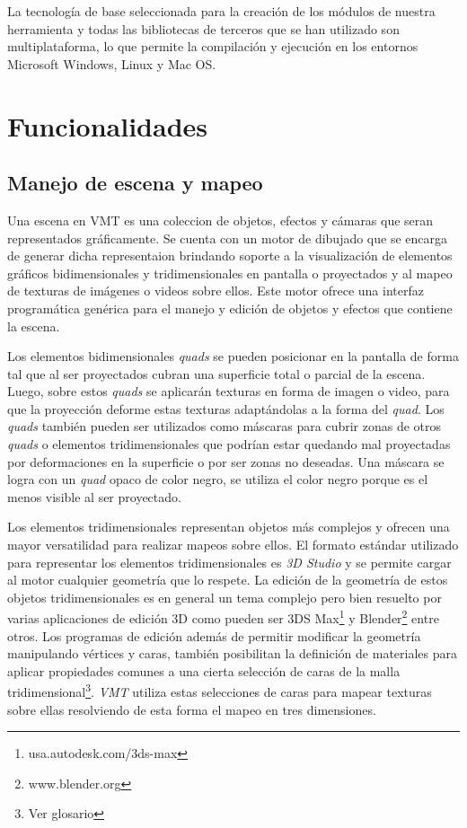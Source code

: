 La tecnología de base seleccionada para la creación de los módulos de nuestra herramienta y todas las bibliotecas de terceros que se han utilizado son multiplataforma, lo que permite la compilación y ejecución en los entornos Microsoft Windows, Linux y Mac OS.

\section{Funcionalidades}

\subsection{Manejo de escena y mapeo}

Una escena en VMT es una coleccion de objetos, efectos y cámaras que seran representados gráficamente. Se cuenta con un motor de dibujado que se encarga de generar dicha representaion brindando soporte a la visualización de elementos gráficos bidimensionales y tridimensionales en pantalla o proyectados y al mapeo de texturas de imágenes o videos sobre ellos. Este motor ofrece una interfaz programática genérica para el manejo y edición de objetos y efectos que contiene la escena.

Los elementos bidimensionales \emph{quads} se pueden posicionar en la pantalla de forma tal que al ser proyectados cubran una superficie total o parcial de la escena. Luego, sobre estos \emph{quads} se aplicarán texturas en forma de imagen o video, para que la proyección deforme estas texturas adaptándolas a la forma del \emph{quad}.
Los \emph{quads} también pueden ser utilizados como máscaras para cubrir zonas de otros \emph{quads} o elementos tridimensionales que podrían estar quedando mal proyectadas por deformaciones en la superficie o por ser zonas no deseadas. Una máscara se logra con un \emph{quad} opaco de color negro, se utiliza el color negro porque es el menos visible al ser proyectado.

Los elementos tridimensionales representan objetos más complejos y ofrecen una mayor versatilidad para realizar mapeos sobre ellos.
El formato estándar utilizado para representar los elementos tridimensionales es \emph{3D Studio}\cite{3DS} y se permite cargar al motor cualquier geometría que lo respete.
La edición de la geometría de estos objetos tridimensionales es en general un tema complejo pero bien resuelto por varias aplicaciones de edición 3D como pueden ser 3DS Max\footnote{usa.autodesk.com/3ds-max} y Blender\footnote{www.blender.org} entre otros. %
Los programas de edición además de permitir modificar la geometría manipulando vértices y caras, también posibilitan la definición de materiales para aplicar propiedades comunes a una cierta selección de caras de la malla tridimensional\footnote{Ver glosario}. \emph{VMT} utiliza estas selecciones de caras para mapear texturas sobre ellas resolviendo de esta forma el mapeo en tres dimensiones.

